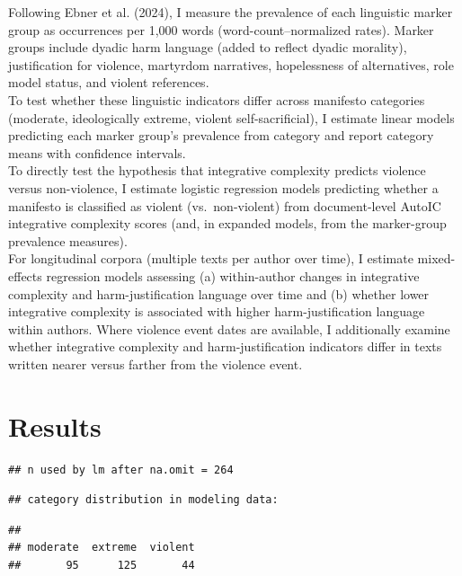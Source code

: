 \documentclass[
  english,
  man,floatsintext]{apa6}
\begin{document}
Following Ebner et al. (2024), I measure the prevalence of each linguistic marker group as occurrences per 1,000 words (word-count--normalized rates). Marker groups include dyadic harm language (added to reflect dyadic morality), justification for violence, martyrdom narratives, hopelessness of alternatives, role model status, and violent references.\\
To test whether these linguistic indicators differ across manifesto categories (moderate, ideologically extreme, violent self-sacrificial), I estimate linear models predicting each marker group's prevalence from category and report category means with confidence intervals.\\
To directly test the hypothesis that integrative complexity predicts violence versus non-violence, I estimate logistic regression models predicting whether a manifesto is classified as violent (vs.~non-violent) from document-level AutoIC integrative complexity scores (and, in expanded models, from the marker-group prevalence measures).\\
For longitudinal corpora (multiple texts per author over time), I estimate mixed-effects regression models assessing (a) within-author changes in integrative complexity and harm-justification language over time and (b) whether lower integrative complexity is associated with higher harm-justification language within authors. Where violence event dates are available, I additionally examine whether integrative complexity and harm-justification indicators differ in texts written nearer versus farther from the violence event.

\section{Results}\label{results}

\begin{verbatim}
## n used by lm after na.omit = 264
\end{verbatim}

\begin{verbatim}
## category distribution in modeling data:
\end{verbatim}

\begin{verbatim}
## 
## moderate  extreme  violent 
##       95      125       44
\end{verbatim}
\end{document}
